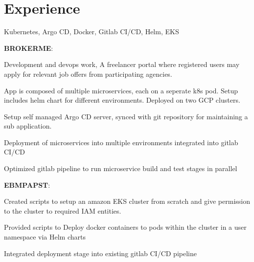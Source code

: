 \documentclass[]{font}
\begin{document}
\begin{minipage}[t]{0.66\textwidth} 


\section{Experience}


Kubernetes, Argo CD, Docker, Gitlab CI/CD, Helm, EKS
\vspace{\topsep}

\textbf{BROKERME}:
\vspace{\topsep}

\begin{tightemize}
\item Development and devops work, A freelancer portal where registered users may apply for relevant job offers from participating agencies.
\item App is composed of multiple microservices, each on a seperate k8s pod. Setup includes helm chart for different environments. Deployed on two GCP clusters.
\item Setup self managed Argo CD server, synced with git repository for maintaining a sub application.
\item Deployment of microservices into multiple environments integrated into gitlab CI/CD
\item Optimized gitlab pipeline to run microservice build and test stages in parallel
\end{tightemize}

\vspace{\topsep}
\textbf{EBMPAPST}:

\begin{tightemize}
\item Created scripts to setup an amazon EKS cluster from scratch and give permission to the cluster to required IAM entities.
\item Provided scripts to Deploy docker containers to pods within the cluster in a user namespace via Helm charts
\item Integrated deployment stage into existing gitlab CI/CD pipeline
\end{tightemize}
\sectionsep


\end{minipage}
\end{document}
